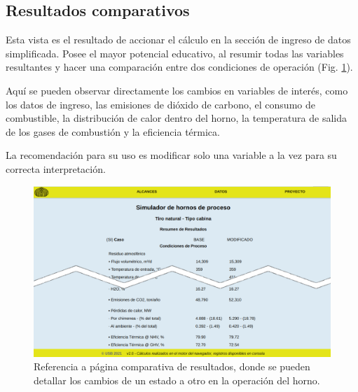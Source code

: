 \subsection{Resultados comparativos}
\par Esta vista es el resultado de accionar el cálculo en la sección de ingreso de datos simplificada. Posee el mayor potencial educativo, al resumir todas las variables resultantes y hacer una comparación entre dos condiciones de operación (Fig. \ref{fig:resultados}).
\par Aquí se pueden observar directamente los cambios en variables de interés, como los datos de ingreso, las emisiones de dióxido de carbono, el consumo de combustible, la distribución de calor dentro del horno, la temperatura de salida de los gases de combustión y la eficiencia térmica.
\par La recomendación para su uso es modificar solo una variable a la vez para su correcta interpretación.
\begin{figure}[H]
\begin{center}
\includegraphics[scale=0.3]{images/result}
\caption[Página comparativa de resultados]{Referencia a página comparativa de resultados, donde se pueden detallar los cambios de un estado a otro en la operación del horno.}
\label{fig:resultados}
\end{center}
\end{figure}

